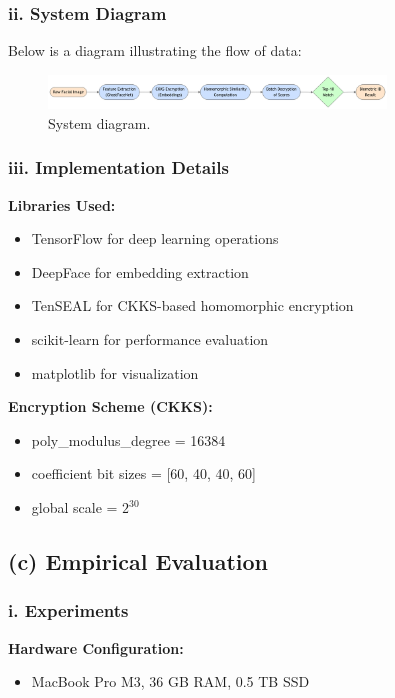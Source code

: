 \documentclass[12pt,a4paper]{article}
\begin{document}
\subsubsection*{ii. System Diagram}
Below is a diagram illustrating the flow of data:

\begin{figure}[H]
    \centering
    \includegraphics[width=0.8\textwidth]{./elements/System diagram.png}
    \caption{System diagram.}
    \label{fig:system_diagram}
\end{figure}

\subsubsection*{iii. Implementation Details}
\textbf{Libraries Used:}
\begin{itemize}
    \item TensorFlow for deep learning operations
    \item DeepFace for embedding extraction
    \item TenSEAL for CKKS-based homomorphic encryption
    \item scikit-learn for performance evaluation
    \item matplotlib for visualization
\end{itemize}

\textbf{Encryption Scheme (CKKS):}
\begin{itemize}
    \item poly\_modulus\_degree = 16384
    \item coefficient bit sizes = [60, 40, 40, 60]
    \item global scale = \(2^{30}\)
\end{itemize}

\subsection{(c) Empirical Evaluation}

\subsubsection*{i. Experiments}
\textbf{Hardware Configuration:}
\begin{itemize}
    \item MacBook Pro M3, 36 GB RAM, 0.5 TB SSD
\end{itemize}
\end{document}
